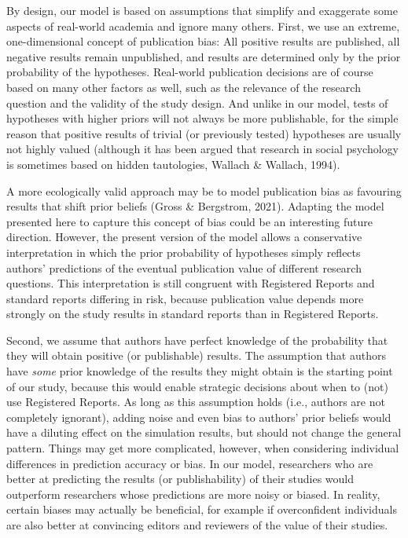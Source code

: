 \documentclass[
  ,man,mask,floatsintext]{apa6}
\begin{document}
By design, our model is based on assumptions that simplify and exaggerate some aspects of real-world academia and ignore many others.
First, we use an extreme, one-dimensional concept of publication bias:
All positive results are published, all negative results remain unpublished, and results are determined only by the prior probability of the hypotheses.
Real-world publication decisions are of course based on many other factors as well, such as the relevance of the research question and the validity of the study design.
And unlike in our model, tests of hypotheses with higher priors will not always be more publishable, for the simple reason that positive results of trivial (or previously tested) hypotheses are usually not highly valued (although it has been argued that
research in social psychology is sometimes based on hidden tautologies, Wallach \& Wallach, 1994).

A more ecologically valid approach may be to model publication bias as favouring results that shift prior beliefs (Gross \& Bergstrom, 2021).
Adapting the model presented here to capture this concept of bias could be an interesting future direction.
However, the present version of the model allows a conservative interpretation in which the prior probability of hypotheses simply reflects authors' predictions of the eventual publication value of different research questions.
This interpretation is still congruent with Registered Reports and standard reports differing in risk, because publication value depends more strongly on the study results in standard reports than in Registered Reports.

Second, we assume that authors have perfect knowledge of the probability that they will obtain positive (or publishable) results.
The assumption that authors have \emph{some} prior knowledge of the results they might obtain is the starting point of our study, because this would enable strategic decisions about when to (not) use Registered Reports.
As long as this assumption holds (i.e., authors are not completely ignorant), adding noise and even bias to authors' prior beliefs would have a diluting effect on the simulation results, but should not change the general pattern.
Things may get more complicated, however, when considering individual differences in
prediction accuracy or bias.
In our model, researchers who are better at predicting the results (or publishability) of their studies would outperform researchers whose predictions are more noisy or biased.
In reality, certain biases may actually be beneficial, for example if overconfident individuals are also better at convincing editors and reviewers of the value of their studies.
\end{document}
